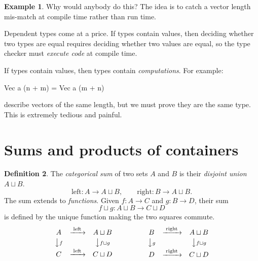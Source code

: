 \documentclass[11pt, a4paper]{article}
\theoremstyle{definition}
\newtheorem{definition}{Definition}[section]
\newtheorem{example}[definition]{Example}
\theoremstyle{plain}
\begin{document}
{{\begin{example}
\medskip
\noindent
Why would anybody do this?  The idea is to catch a vector length mis-match
at compile time rather than run time.

Dependent types come at a price.  If types contain values, then deciding
whether two types are equal requires deciding whether two values are
equal, so the type checker must \emph{execute code} at compile time.

\medskip
\noindent
If types contain values, then types contain \emph{computations}.
For example:
\begin{center}
\colorbox{gray!15}{\begin{minipage}{0.85\linewidth}
\ttfamily
Vec a (n + m) = Vec a (m + n)
\end{minipage}}
\end{center}
describe vectors of the same length, but we must prove they are
the same type.  This is extremely tedious and painful.
\end{example}%
}}

\section{Sums and products of containers}

\noindent\colorbox{gray!15}{\parbox{\dimexpr\linewidth-2\fboxsep}{%
\begin{definition}\label{def:sum-functions}
The \emph{categorical sum} of two sets $A$ and $B$ is their
\emph{disjoint union} $A \sqcup B$.
\[
  \mathrm{left} : A \to A \sqcup B,
  \qquad
  \mathrm{right} : B \to A \sqcup B.
\]
The sum extends to \emph{functions}.  Given $f : A \to C$ and
$g : B \to D$, their sum
\[
  f \sqcup g : A \sqcup B \to C \sqcup D
\]
is defined by the unique function
making the two squares commute.
\[
\begin{array}{ccc}
  A & \xrightarrow{\;\mathrm{left}\;} & A \sqcup B\\[2pt]
  \big\downarrow{\scriptstyle f} & & \big\downarrow{\scriptstyle f \sqcup g}\\[2pt]
  C & \xrightarrow{\;\mathrm{left}\;} & C \sqcup D
\end{array}
\qquad\qquad
\begin{array}{ccc}
  B & \xrightarrow{\;\mathrm{right}\;} & A \sqcup B\\[2pt]
  \big\downarrow{\scriptstyle g} & & \big\downarrow{\scriptstyle f \sqcup g}\\[2pt]
  D & \xrightarrow{\;\mathrm{right}\;} & C \sqcup D
\end{array}
\]
\end{definition}%
}}
\end{document}
